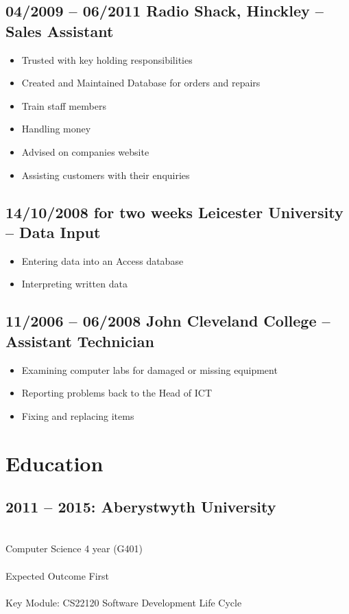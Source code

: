 \documentclass[0pt]{article}
\begin{document}
\subsection*{04/2009 -- 06/2011   Radio Shack, Hinckley -- Sales Assistant}
\begin{itemize}
	\item Trusted with key holding responsibilities
	\item Created and Maintained Database for orders and repairs
	\item Train staff members
	\item Handling money
	\item Advised on companies website
	\item Assisting customers with their enquiries
\end{itemize}
	
\subsection*{14/10/2008 for two weeks     Leicester University --  Data Input}
\begin{itemize}
	\item Entering data into an Access database
	\item Interpreting written data
\end{itemize}

\subsection*{11/2006 -- 06/2008      John Cleveland College -- Assistant Technician}
\begin{itemize}
	\item Examining computer labs for damaged or missing equipment
	\item Reporting problems back to the Head of ICT
	\item Fixing and replacing items
\end{itemize}

\section*{Education}
\subsection*{2011 -- 2015: Aberystwyth University}
\begin{tabbing}
~~~~~~~~~~~~~~~~~~~~~~~~\=\\
\> Computer Science 4 year (G401)\\
\\
\> Expected Outcome First\\
\\
\> Key Module: CS22120 Software Development Life Cycle   
\end{tabbing}
\end{document}
